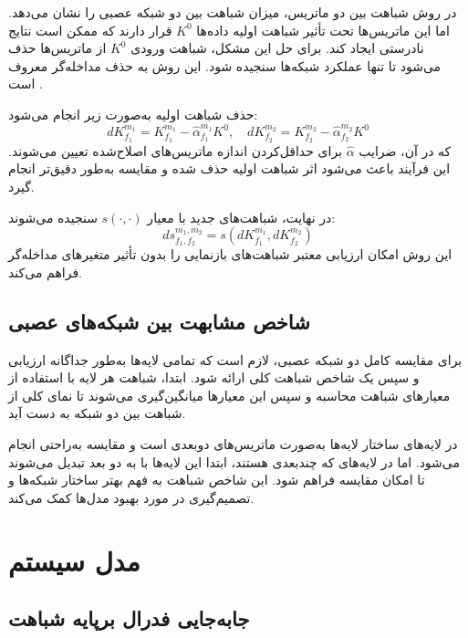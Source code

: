  در روش  
 شباهت بین دو ماتریس، میزان شباهت بین دو شبکه عصبی را نشان می‌دهد. اما این ماتریس‌ها تحت تأثیر شباهت اولیه داده‌ها  
 \( K^0 \)  
 قرار دارند که ممکن است نتایج نادرستی ایجاد کند. برای حل این مشکل، شباهت ورودی  
 \( K^0 \)  
 از ماتریس‌ها حذف می‌شود تا تنها عملکرد شبکه‌ها سنجیده شود. این روش به حذف مداخله‌گر معروف است  
 \cite{cui2022deconfounded}.  
 
 حذف شباهت اولیه به‌صورت زیر انجام می‌شود:  
 \[
 dK^{m_1}_{f_1} = K^{m_1}_{f_1} - \hat{\alpha}^{m_1}_{f_1} K^0,  \quad dK^{m_2}_{f_2} = K^{m_2}_{f_2} - \hat{\alpha}^{m_2}_{f_2} K^0  
 \]  
 که در آن، ضرایب \(\hat{\alpha}\) برای حداقل‌کردن اندازه ماتریس‌های اصلاح‌شده تعیین می‌شوند. این فرآیند باعث می‌شود اثر شباهت اولیه حذف شده و مقایسه به‌طور دقیق‌تر انجام گیرد.  
 
 در نهایت، شباهت‌های جدید با معیار  
 \( s(\cdot, \cdot) \)  
 سنجیده می‌شوند:  
 \[
 ds^{m_1,m_2}_{f_1,f_2} = s(dK^{m_1}_{f_1}, dK^{m_2}_{f_2})  
 \]  
 این روش امکان ارزیابی معتبر شباهت‌های بازنمایی را بدون تأثیر متغیرهای مداخله‌گر فراهم می‌کند.
 
 
 
 
 
 
 \subsection{شاخص مشابهت بین شبکه‌های عصبی}
 برای مقایسه کامل دو شبکه عصبی، لازم است که تمامی لایه‌ها به‌طور جداگانه ارزیابی و سپس یک شاخص شباهت کلی ارائه شود. ابتدا، شباهت هر لایه با استفاده از معیارهای شباهت محاسبه و سپس این معیارها میانگین‌گیری می‌شوند تا نمای کلی از شباهت بین دو شبکه به دست آید.
 
 در لایه‌های  
 ساختار لایه‌ها به‌صورت ماتریس‌های دوبعدی است و مقایسه به‌راحتی انجام می‌شود. اما در لایه‌های  
 که چندبعدی هستند، ابتدا این لایه‌ها با  
 به دو بعد تبدیل می‌شوند تا امکان مقایسه فراهم شود. 
 این شاخص شباهت به فهم بهتر ساختار شبکه‌ها و تصمیم‌گیری در مورد بهبود مدل‌ها کمک می‌کند.
  
 
 
 
 
\section{مدل سیستم}

\subsection{
		جابه‌جایی فدرال برپایه شباهت%
}


